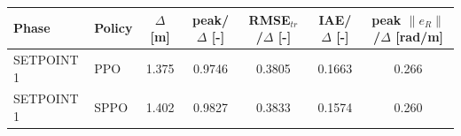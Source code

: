 \begin{tabular}{llccccc}
\toprule
Phase & Policy & $\Delta$ [m] & peak/$\Delta$ [-] & RMSE$_{tr}$/$\Delta$ [-] & IAE/$\Delta$ [-] & peak $\|e_R\|$/$\Delta$ [rad/m] \\
\midrule
SETPOINT 1 & PPO & 1.375 & 0.9746 & 0.3805 & 0.1663 & 0.266 \\
SETPOINT 1 & SPPO & 1.402 & 0.9827 & 0.3833 & 0.1574 & 0.260 \\
\bottomrule
\end{tabular}
